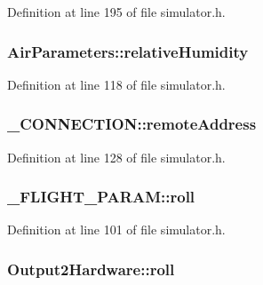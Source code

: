 Definition at line 195 of file simulator.\-h.

\hypertarget{group___h_i_t_l_plugin_ga259002c03d3dec62e3af14ded35e5bfd}{
\subsubsection[{relative\-Humidity}]{ Air\-Parameters\-::relative\-Humidity}}\label{group___h_i_t_l_plugin_ga259002c03d3dec62e3af14ded35e5bfd}


Definition at line 118 of file simulator.\-h.

\hypertarget{group___h_i_t_l_plugin_ga72b83e685c950b6c36c9eed28c775ec4}{
\subsubsection[{remote\-Address}]{ \-\_\-\-C\-O\-N\-N\-E\-C\-T\-I\-O\-N\-::remote\-Address}}\label{group___h_i_t_l_plugin_ga72b83e685c950b6c36c9eed28c775ec4}


Definition at line 128 of file simulator.\-h.

\hypertarget{group___h_i_t_l_plugin_ga1e4f51848f0c33a0264bc1fc9acb63db}{
\subsubsection[{roll}]{ \-\_\-\-F\-L\-I\-G\-H\-T\-\_\-\-P\-A\-R\-A\-M\-::roll}}\label{group___h_i_t_l_plugin_ga1e4f51848f0c33a0264bc1fc9acb63db}


Definition at line 101 of file simulator.\-h.

\hypertarget{group___h_i_t_l_plugin_ga8f2327775c3342e13799a4ed6392f23f}{
\subsubsection[{roll}]{ Output2\-Hardware\-::roll}}\label{group___h_i_t_l_plugin_ga8f2327775c3342e13799a4ed6392f23f}


